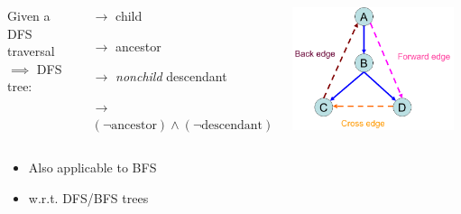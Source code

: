\begin{frame}
  \begin{definition}
    \begin{columns}
	Given a DFS traversal $\implies$ DFS tree:
	\begin{description}
	  \item[Tree edge:] $\to$ child \\[10pt]
	  \item[Back edge:] $\to$ ancestor
	  \item[Forward edge:] $\to$ \emph{nonchild} descendant
	  \item[Cross edge:] $\to$ $(\lnot \text{ancestor}) \land (\lnot \text{descendant})$
	\end{description}
	\includegraphics[width = 0.95\textwidth]{figs/dfs-digraph.png}
    \end{columns}
  \end{definition}

  \pause
  \vspace{0.50cm}
  \begin{itemize}
    \centering
    \item Also applicable to BFS
    \item w.r.t. DFS/BFS trees
  \end{itemize}
\end{frame}

